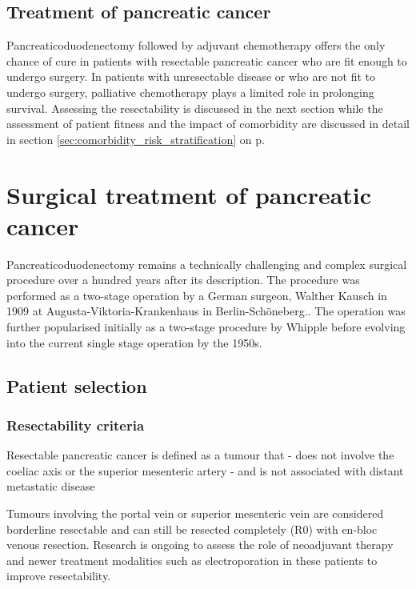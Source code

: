 \subsection{Treatment of pancreatic cancer}
Pancreaticoduodenectomy followed by adjuvant chemotherapy offers the only chance of cure in patients with resectable pancreatic cancer who are fit enough to undergo surgery. In patients with unresectable disease or who are not fit to undergo surgery, palliative chemotherapy plays a limited role in prolonging survival. Assessing the resectability is discussed in the next section while the assessment of patient fitness and the impact of comorbidity are discussed in detail in section \ref{sec:comorbidity_risk_stratification} on p\pageref{sec:comorbidity_risk_stratification}.

\section{Surgical treatment of pancreatic cancer}
Pancreaticoduodenectomy remains a technically challenging and complex surgical procedure over a hundred years after its description. The procedure was performed as a two-stage operation by a German surgeon, Walther Kausch in 1909 at Augusta-Viktoria-Krankenhaus in Berlin-Schöneberg.\parencite{kausch_carcinom_1912}. The operation was further popularised initially as a two-stage procedure by Whipple\parencite{whipple_treatment_1935} before evolving into the current single stage operation by the 1950s.\parencite{whipple_rationale_1941,whipple_radical_1950}

\subsection{Patient selection}
\subsubsection{Resectability criteria}
Resectable pancreatic cancer is defined as a tumour that
- does not involve the coeliac axis or the superior mesenteric artery
- and is not associated with distant metastatic disease

Tumours involving the portal vein or superior mesenteric vein are considered borderline resectable and can still be resected completely (R0) with en-bloc venous resection. Research is ongoing to assess the role of neoadjuvant therapy and newer treatment modalities such as electroporation in these patients to improve resectability.

